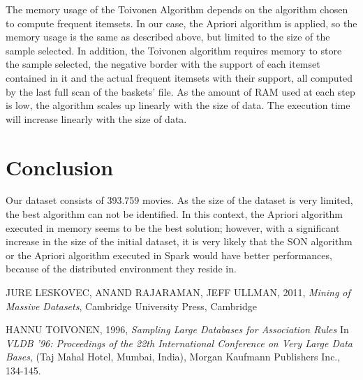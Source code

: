 \documentclass[conference,compsoc]{IEEEtran}
\theoremstyle{definition}
\begin{document}
The memory usage of the Toivonen Algorithm depends on the algorithm chosen to compute frequent itemsets. In our case, the Apriori algorithm is applied, so the memory usage is the same as described above, but limited to the size of the sample selected. In addition, the Toivonen algorithm requires memory to store the sample selected, the negative border with the support of each itemset contained in it and the actual frequent itemsets with their support, all computed by the last full scan of the baskets' file. As the amount of RAM used at each step is low, the algorithm scales up linearly with the size of data. The execution time will increase linearly with the size of data. 


\section{Conclusion}

Our dataset consists of 393.759 movies. As the size of the dataset is very limited, the best algorithm can not be identified. In this context, the Apriori algorithm executed in memory seems to be the best solution; however, with a significant increase in the size of the initial dataset, it is very likely that the SON algorithm or the Apriori algorithm executed in Spark would have better performances, because of the distributed environment they reside in.


\begin{thebibliography}{1}

JURE LESKOVEC, ANAND RAJARAMAN, JEFF ULLMAN, 2011, \emph{Mining of Massive Datasets}, Cambridge University Press, Cambridge

  \label{Toivonen}
HANNU TOIVONEN,  1996, \emph{Sampling Large Databases for Association Rules} In \emph{VLDB '96: Proceedings of the 22th International Conference on Very Large Data Bases}, (Taj Mahal Hotel, Mumbai, India), Morgan Kaufmann Publishers Inc., 134-145.
\end{thebibliography}
\end{document}
